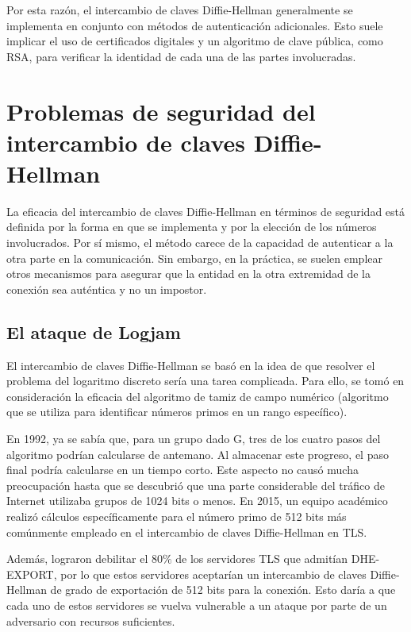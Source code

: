 \documentclass[11pt]{article}
\begin{document}
Por esta razón, el intercambio de claves Diffie-Hellman generalmente se implementa en conjunto con métodos de autenticación adicionales. Esto suele implicar el uso de certificados digitales y un algoritmo de clave pública, como RSA, para verificar la identidad de cada una de las partes involucradas.



\section{Problemas de seguridad del intercambio de claves Diffie-Hellman}
La eficacia del intercambio de claves Diffie-Hellman en términos de seguridad está definida por la forma en que se implementa y por la elección de los números involucrados. Por sí mismo, el método carece de la capacidad de autenticar a la otra parte en la comunicación. Sin embargo, en la práctica, se suelen emplear otros mecanismos para asegurar que la entidad en la otra extremidad de la conexión sea auténtica y no un impostor.

\subsection {El ataque de Logjam}

El intercambio de claves Diffie-Hellman se basó en la idea de que resolver el problema del logaritmo discreto sería una tarea complicada. Para ello, se tomó en consideración la eficacia del algoritmo de tamiz de campo numérico (algoritmo que se utiliza para identificar números primos en un rango específico).

\newpage

En 1992, ya se sabía que, para un grupo dado G, tres de los cuatro pasos del algoritmo podrían calcularse de antemano. Al almacenar este progreso, el paso final podría calcularse en un tiempo corto. Este aspecto no causó mucha preocupación hasta que se descubrió que una parte considerable del tráfico de Internet utilizaba grupos de 1024 bits o menos. En 2015, un equipo académico realizó cálculos específicamente para el número primo de 512 bits más comúnmente empleado en el intercambio de claves Diffie-Hellman en TLS.


Además, lograron debilitar el 80$\%$ de los servidores TLS que admitían DHE-EXPORT, por lo que estos servidores aceptarían un intercambio de claves Diffie-Hellman de grado de exportación de 512 bits para la conexión. Esto daría a que cada uno de estos servidores se vuelva vulnerable a un ataque por parte de un adversario con recursos suficientes.
\end{document}
